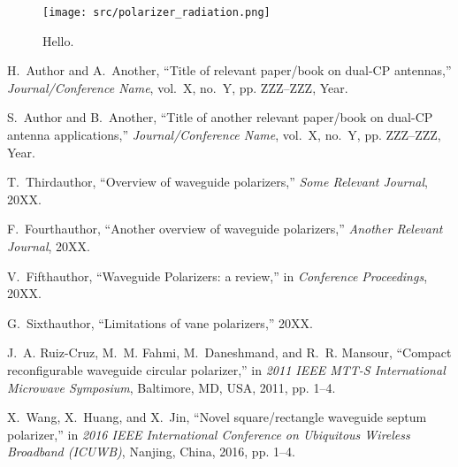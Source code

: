 \documentclass[journal]{IEEEtran}
\begin{document}
\begin{figure}
    \centering
    \texttt{[image: src/polarizer\_radiation.png]}
    \caption{\label{fig:polarizer_radiation} Hello.}
\end{figure}

\begin{thebibliography}{1}
    
    H.~Author and A.~Another, ``Title of relevant paper/book on dual-CP antennas,'' \emph{Journal/Conference Name}, vol.~X, no.~Y, pp. ZZZ--ZZZ, Year.
    
    S.~Author and B.~Another, ``Title of another relevant paper/book on dual-CP antenna applications,'' \emph{Journal/Conference Name}, vol.~X, no.~Y, pp. ZZZ--ZZZ, Year.
    
    T.~Thirdauthor, ``Overview of waveguide polarizers,'' \emph{Some Relevant Journal}, 20XX.
    
    F.~Fourthauthor, ``Another overview of waveguide polarizers,'' \emph{Another Relevant Journal}, 20XX.
    
    V.~Fifthauthor, ``Waveguide Polarizers: a review,'' in \emph{Conference Proceedings}, 20XX.
    
    G.~Sixthauthor, ``Limitations of vane polarizers,'' 20XX.
    
    J.~A. Ruiz-Cruz, M.~M. Fahmi, M.~Daneshmand, and R.~R. Mansour, ``Compact reconfigurable waveguide circular polarizer,'' in \emph{2011 IEEE MTT-S International Microwave Symposium}, Baltimore, MD, USA, 2011, pp. 1--4.
    
    X.~Wang, X.~Huang, and X.~Jin, ``Novel square/rectangle waveguide septum polarizer,'' in \emph{2016 IEEE International Conference on Ubiquitous Wireless Broadband (ICUWB)}, Nanjing, China, 2016, pp. 1--4.
    

\end{thebibliography}
\end{document}
